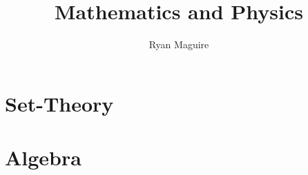 \documentclass[oneside]{book}                                                  %
\title{Mathematics and Physics}                                                %
\author{Ryan Maguire}                                                          %
\date{\vspace{-5ex}}                                                           %
\newcommand*{\TOPPATH}{Encyclopedia_Mathematica/books}
\begin{document}
    \maketitle
    \tableofcontents
    \listoffigures
    \listoftables
    \clearpage
        \part{Set-Theory}
            \newcommand{\PATH}{\TOPPATH/Foundations}
            

        \part{Algebra}
            \renewcommand{\PATH}{\TOPPATH/Algebra}
             

    

\end{document}
